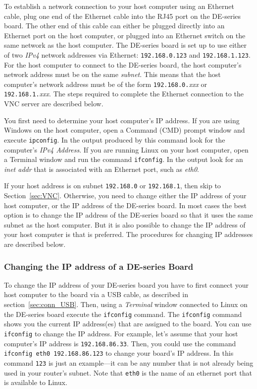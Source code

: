 \documentclass[11pt, twoside, pdftex]{article}
\begin{document}
To establish a network connection to your host computer using an Ethernet cable, plug one end 
of the Ethernet cable into the RJ45 port on the DE-series board. The other end of this cable
can either be plugged directly into an Ethernet port on the host computer, or plugged
into an Ethernet switch on the same network as the host computer. The DE-series board is set 
up to use either of two {\it IPv4} network addresses via Ethernet: \texttt{192.168.0.123} and 
\texttt{192.168.1.123}. For the 
host computer to connect to the DE-series board, the host computer's network address must be on the
same {\it subnet}. This means that the host computer's network address must be of the form
\texttt{192.168.0.}{\it xxx} or \texttt{192.168.1.}{\it xxx}. The steps required to complete 
the Ethernet connection to the VNC server are described below.

You first need to determine your host computer's IP address. If you are using Windows on 
the host computer, 
open a Command (CMD) prompt window and execute \texttt{ipconfig}. In the output produced by 
this command look for the computer's {\it IPv4 Address}. If you are running Linux on your
host computer, open a Terminal window and run the command \texttt{ifconfig}. In the output
look for an {\it inet addr} that is associated with an Ethernet port, such as {\it eth0}.

If your host address is on subnet \texttt{192.168.0} or \texttt{192.168.1}, then skip to 
Section~\ref{sec:VNC}.  Otherwise, you need to change either the IP address of your host 
computer, or the IP address of the DE-series
board. In most cases the best option is to change the IP address of the DE-series board so 
that it uses the same subnet as the host computer. But it is also possible 
to change the IP address of your host computer is that is preferred. The procedures for 
changing IP addresses are described below.

\subsubsection*{Changing the IP address of a DE-series Board}

To change the IP address of your DE-series board you have to first connect your host computer
to the board via a USB cable, as described in section~\ref{sec:conn_USB}. Then, using a 
{\it Terminal} window connected to Linux on the DE-series board execute the \texttt{ifconfig} 
command. The \texttt{ifconfig} command shows you the current IP address(es) that are
assigned to the board. You can use \texttt{ifconfig} to change the IP address. For example, 
let's assume that your host computer's IP address is \texttt{192.168.86.33}. Then, you could 
use the command \texttt{ifconfig eth0 192.168.86.123} to change your board's IP address.
In this command \texttt{123} is just an example---it can be any number that is not
already being used in your router's subnet. Note that \texttt{eth0} is the name of an ethernet
port that is available to Linux.
\end{document}
